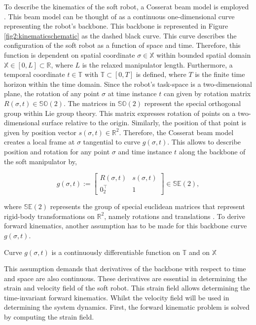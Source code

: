 To describe the kinematics of the soft robot, a Cosserat beam model is employed \cite{Boyer2019}. This beam model can be thought of as a continuous one-dimensional curve representing the robot's backbone. This backbone is represented in Figure \ref{fig2:kinematicschematic} as the dashed black curve. This curve describes the configuration of the soft robot as a function of space and time. Therefore, this function is dependent on spatial coordinate $\sigma \in \mathbb{X}$ within bounded spatial domain $\mathbb{X} \in [0,L] \subset \mathbb{R}$, where $L$ is the relaxed manipulator length. Furthermore, a temporal coordinate $t \in \mathbb{T}$ with $\mathbb{T} \subset [0,T]$ is defined, where $T$ is the finite time horizon within the time domain. Since the robot's task-space is a two-dimensional plane, the rotation of any point $\sigma$ at time instance $t$ can given by rotation matrix $R(\sigma,t) \in \mathbb{SO}(2)$. The matrices in $\mathbb{SO}(2)$ represent the special orthogonal group within Lie group theory. This matrix expresses rotation of points on a two-dimensional surface relative to the origin. Similarly, the position of that point is given by position vector $s(\sigma,t) \in \mathbb{R}^2$. Therefore, the Cosserat beam model creates a local frame at $\sigma$ tangential to curve $g(\sigma,t)$. This allows to describe position and rotation for any point $\sigma$ and time instance $t$ along the backbone of the soft manipulator by,


\begin{equation}
    g(\sigma,t) := \begin{bmatrix}  R(\sigma,t) & s(\sigma,t) \\ 0_2^\top & 1 \end{bmatrix} \in \mathbb{SE}(2),
    \label{eq2:g}
\end{equation}

where $\mathbb{SE}(2)$ represents the group of special euclidean matrices that represent rigid-body transformations on $\mathbb{R}^2$, namely rotations and translations \cite{Sola2018}. To derive forward kinematics, another assumption has to be made for this backbone curve $g(\sigma,t)$.

\begin{theorem}
Curve  $g(\sigma,t)$ is a continuously differentiable function on $\mathbb{T}$ and on $\mathbb{X}$
\end{theorem}

This assumption demands that derivatives of the backbone with respect to time and space are also continuous. These derivatives are essential in determining the strain and velocity field of the soft robot. This strain field allows determining the time-invariant forward kinematics. Whilst the velocity field will be used in determining the system dynamics. First, the forward kinematic problem is solved by computing the strain field.




